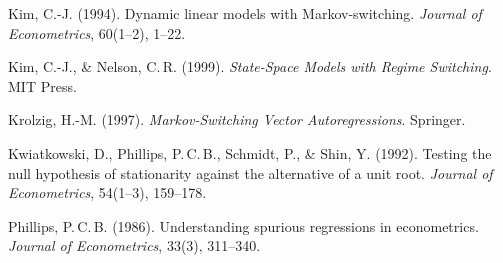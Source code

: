 \documentclass[11pt,a4paper]{article}
\theoremstyle{definition}
\begin{document}
{\begin{list}{}{\setlength{\leftmargin}{1.2em}\setlength{\itemindent}{-1.2em}\setlength{\itemsep}{2pt}}
\item Kim, C.-J. (1994). Dynamic linear models with Markov-switching. \emph{Journal of Econometrics}, 60(1--2), 1--22.
\item Kim, C.-J., \& Nelson, C.\,R. (1999). \emph{State-Space Models with Regime Switching}. MIT Press.
\item Krolzig, H.-M. (1997). \emph{Markov-Switching Vector Autoregressions}. Springer.
\item Kwiatkowski, D., Phillips, P.\,C.\,B., Schmidt, P., \& Shin, Y. (1992). Testing the null hypothesis of stationarity against the alternative of a unit root. \emph{Journal of Econometrics}, 54(1--3), 159--178.
\item Phillips, P.\,C.\,B. (1986). Understanding spurious regressions in econometrics. \emph{Journal of Econometrics}, 33(3), 311--340.
\end{list}
}

\vspace{6mm}
\end{document}
